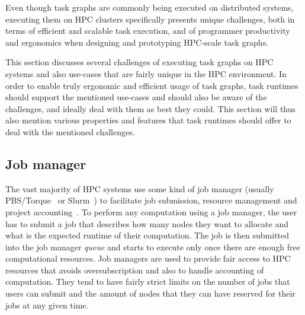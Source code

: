 Even though task graphs are commonly being executed on distributed systems,
executing them on HPC clusters specifically presents unique challenges, both in terms of
efficient and scalable task execution, and of programmer productivity and ergonomics when
designing and prototyping HPC-scale task graphs.



This section discusses several challenges of executing task graphs on HPC systems and also
use-cases that are fairly unique in the HPC environment. In order to enable truly ergonomic and
efficient usage of task graphs, task runtimes should support the mentioned use-cases and should
also be aware of the challenges, and ideally deal with them as best they could. This section will
thus also mention various properties and features that task runtimes should offer to deal with the
mentioned challenges.

\subsection{Job manager}
The vast majority of HPC systems use some kind of job manager (usually PBS/Torque~\cite{pbs} or
Slurm~\cite{slurm}) to facilitate job submission, resource management and project
accounting~\cite{slurm-schedmd}. To perform any computation using a job manager, the user has to
submit a job that describes how many nodes they want to allocate and what is the expected
runtime of their computation. The job is then submitted into the job manager \emph{queue} and
starts to execute only once there are enough free computational resources. Job managers are used to
provide fair access to HPC resources that avoids oversubscription and also to handle accounting
of computation. They tend to have fairly strict limits on the number of jobs that users can submit
and the amount of nodes that they can have reserved for their jobs at any given time.

